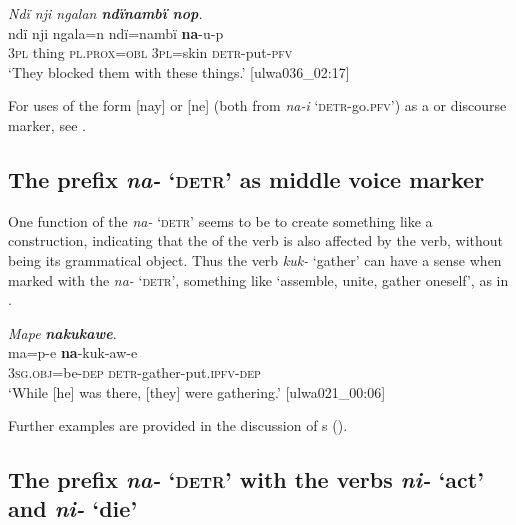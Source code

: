 \ea%
    \label{ex:syntax:316}
          \textit{Ndï nji ngalan \textbf{ndïnambï nop}.}\\
\gll ndï  nji    ngala=n    ndï=nambï  \textbf{na}{}-u-p\\
    \textsc{3pl}  thing  \textsc{pl.prox=obl}  \textsc{3pl}=skin  \textsc{detr-}put-\textsc{pfv}\\
\glt `They blocked them with these things.’ [ulwa036\_02:17]
\z

For uses of the form [nay] or [ne] (both from \textit{na-i} ‘\textsc{detr}{}-go.\textsc{pfv}’) as a  or discourse marker, see .


\subsection{The prefix \textit{na-} ‘\textsc{detr}’ as middle voice marker}\label{sec:13.8.3}


One function of the  \textit{na-} \textsc{‘detr’} seems to be to create something like a  construction, indicating that the  of the verb is also affected by the verb, without being its grammatical object. Thus the verb \textit{kuk-} ‘gather’ can have a  sense when marked with the  \textit{na-} \textsc{‘detr’}, something like ‘assemble, unite, gather oneself’, as in .

\newpage

\ea%
    \label{ex:syntax:317}
          \textit{Mape} \textbf{\textit{nakukawe}}.\\
\gll ma=p-e      \textbf{na}{}-kuk-aw-e\\
    3\textsc{sg.obj}=be\textsc{{}-dep}  \textsc{detr-}gather-put.\textsc{ipfv-dep}\\
\glt    `While [he] was there, [they] were gathering.’ [ulwa021\_00:06]
\z

Further examples are provided in the discussion of s ().


\subsection{The prefix \textit{na-} ‘\textsc{detr}’ with the verbs \textit{ni-} ‘act’ and \textit{ni-} ‘die’}\label{sec:13.8.4}

